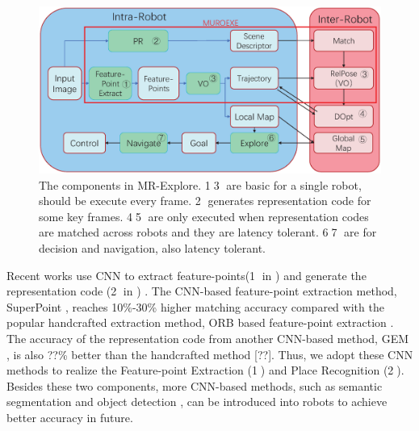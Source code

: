 \begin{figure}[t]
	\centering
	\includegraphics[width=0.99\linewidth]{fig/maexp.eps}
    \caption{
        The components in MR-Explore. \textcircled{1}\textcircled{3} are basic for a single robot, should be execute every frame. \textcircled{2} generates representation code for some key frames. \textcircled{4}\textcircled{5} are only executed when representation codes are matched across robots and they are latency tolerant.  \textcircled{6}\textcircled{7} are for decision and navigation, also latency tolerant.
    }
	\label{fig:maexp}
\end{figure}





Recent works use CNN to extract feature-points(\textcircled{1} in ) \cite{detone2018superpoint, simo2015discriminative, yi2016lift} and generate the representation code (\textcircled{2} in ) \cite{arandjelovic2016netvlad, radenovic2018fine}. 
The CNN-based feature-point extraction method, SuperPoint \cite{detone2018superpoint}, reaches 10\%-30\% higher matching accuracy compared with the popular handcrafted extraction method, ORB based feature-point extraction \cite{Mur-Artal:2017281}.
The accuracy of the representation code from another CNN-based method, GEM \cite{radenovic2018fine}, is also ??\% better than the handcrafted method [??].
Thus, we adopt these CNN methods to realize the Feature-point Extraction (\textcircled{1}) and  Place Recognition (\textcircled{2}). 
Besides these two components, more CNN-based methods, such as semantic segmentation \cite{long2015fully} and object detection \cite{ren2015faster}, can be introduced into robots to achieve better accuracy in future.

